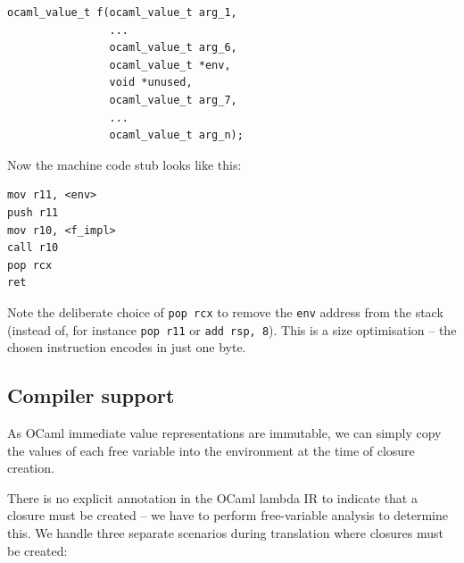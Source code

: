 \documentclass[12pt,a4paper,twoside,openright]{report}
\begin{document}
\begin{lstlisting}
ocaml_value_t f(ocaml_value_t arg_1,
                ...
                ocaml_value_t arg_6,
                ocaml_value_t *env,
                void *unused,
                ocaml_value_t arg_7,
                ...
                ocaml_value_t arg_n);
\end{lstlisting}

Now the machine code stub looks like this:

\begin{lstlisting}
mov r11, <env>
push r11
mov r10, <f_impl>
call r10
pop rcx
ret
\end{lstlisting}

Note the deliberate choice of \lstinline{pop rcx} to remove the
\lstinline{env} address from the stack (instead of, for instance
\lstinline{pop r11} or \lstinline{add rsp, 8}). This is a size optimisation --
the chosen instruction encodes in just one byte.

\subsection{Compiler support}\label{closures-compiler-support}

As OCaml immediate value representations are immutable, we can simply copy the
values of each free variable into the environment at the time of closure
creation.

There is no explicit annotation in the OCaml lambda IR to indicate that a
closure must be created -- we have to perform free-variable analysis
to determine this. We handle three separate scenarios during translation where
closures must be created:
\end{document}
